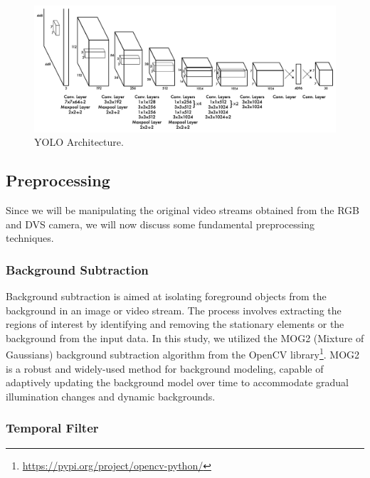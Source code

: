 \documentclass[sigchi,screen]{acmart}
\begin{document}
\begin{figure}[ht] %
    \centering %
    \includegraphics[width=\linewidth]{figures/architecture.png} %
    \caption{YOLO Architecture.} %
    \label{fig:architecture} %
\end{figure}

\subsection{Preprocessing}
\label{ch:pps}
Since we will be manipulating the original video streams obtained from the RGB and DVS camera, we will now discuss some fundamental preprocessing techniques.

\subsubsection{Background Subtraction}
Background subtraction is aimed at isolating foreground objects from the background in an image or video stream. The process involves extracting the regions of interest by identifying and removing the stationary elements or the background from the input data. In this study, we utilized the MOG2 (Mixture of Gaussians) background subtraction algorithm from the OpenCV library\footnote{\url{https://pypi.org/project/opencv-python/}}. MOG2 is a robust and widely-used method for background modeling, capable of adaptively updating the background model over time to accommodate gradual illumination changes and dynamic backgrounds.

\subsubsection{Temporal Filter}
\end{document}
